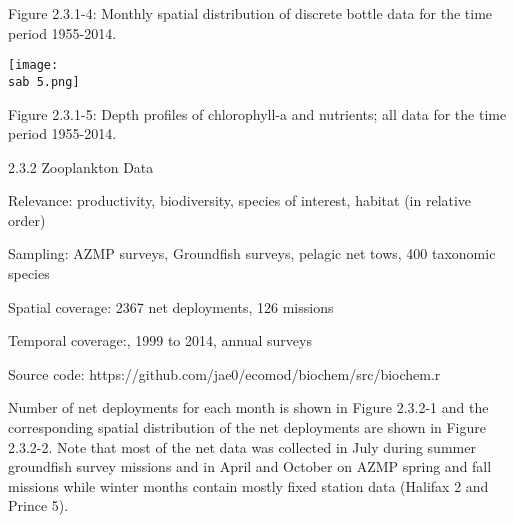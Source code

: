 \documentclass[letterpaper,portrait,12pt]{scrartcl}
\numberwithin{equation}{section}		%
\numberwithin{figure}{section}			%
\numberwithin{table}{section}				%
\newcommand{\sab}{\string~/ecomod_data/mpa/sab/}   %
\begin{document}
Figure 2.3.1-4: Monthly spatial distribution of discrete bottle data for the time period 1955-2014.














\texttt{[image: \\sab 5.png]}















Figure 2.3.1-5: Depth profiles of chlorophyll-a and nutrients; all data for the time period 1955-2014.



















2.3.2  Zooplankton Data









Relevance:  productivity, biodiversity, species of interest, habitat (in relative order)




Sampling:  AZMP surveys, Groundfish surveys, pelagic net tows, 400 taxonomic species




Spatial coverage: 2367 net deployments, 126 missions 




Temporal coverage:,  1999 to 2014, annual surveys




Source code: https://github.com/jae0/ecomod/biochem/src/biochem.r









Number of net deployments for each month is shown in Figure 2.3.2-1 and the corresponding spatial distribution of the net deployments are shown in Figure 2.3.2-2. Note that most of the net data was collected in July during summer groundfish survey missions and in April and October on AZMP spring and fall missions while winter months contain mostly fixed station data (Halifax 2 and Prince 5).
\end{document}

